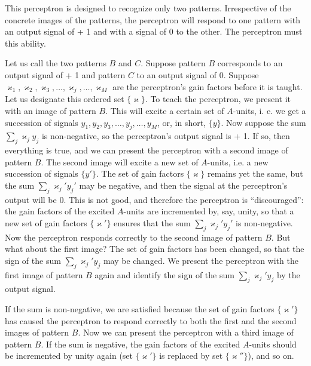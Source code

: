 This perceptron is designed to recognize only two patterns.
Irrespective of the concrete images of the patterns, the perceptron will
respond to one pattern with an output signal of + 1 and with a signal
of 0 to the other. The perceptron must  this ability.

 Let us call the two patterns $B$ and $C$. Suppose pattern $B$ corresponds to an output signal of + 1 and pattern $C$ to an output signal of 0. Suppose $\varkappa_{1}, \varkappa_{2}, \varkappa_{3},\ldots{} ,  \varkappa_{j},\ldots{}, \varkappa_{M}$ are the perceptron's gain factors before it is taught. Let us designate this ordered set $\{ \varkappa \}$. To teach the perceptron, we present it with an image of pattern $B$. This will excite a certain set of $A$-units, i. e. we get a succession of signals $y_{1}, y_{2}, y_{3},\ldots{} ,y_{j},\ldots{} , y_{M}$, or, in short, $\{ y \}$. Now suppose the sum $\sum_{j} \varkappa_{j} y_{j} $ is
non-negative, so the perceptron's output signal is + 1. If so, then
everything is true, and we can present the perceptron with a second
image of pattern $B$. The second image will excite a new set of $A$-units,
i.e. a new succession of signals $\{ y' \}$. The set of gain factors $\{ \varkappa \}$ remains yet the same, but the sum $\sum_{j} \varkappa_{j}' y_{j}' $ may be negative, and then the signal at the perceptron's output will be 0. This is not good, and therefore the perceptron is ``discouraged'': the gain factors of the excited $A$-units are incremented by, say, unity, so that a new set of gain factors $\{ \varkappa '\}$ ensures that the sum $\sum_{j} \varkappa_{j}' y_{j}' $ is non-negative. Now the perceptron responds correctly to the second image of pattern $B$. But what about the first image? The set of gain factors has been changed, so that the sign of the sum $\sum_{j} \varkappa_{j}' y_{j} $ may be changed. We present the perceptron with the first image of pattern $B$ again and identify the sign of the sum $\sum_{j} \varkappa_{j}' y_{j} $  by the output signal.

If the sum is non-negative, we are satisfied because the set of gain
factors $\{ \varkappa' \}$ has caused the perceptron to respond correctly to both the first and the second images of pattern $B$. Now we can present the
perceptron with a third image of pattern $B$. If the sum is negative, the
gain factors of the excited $A$-units should be incremented by unity again
(set $\{ \varkappa' \}$ is replaced by set $\{ \varkappa'' \}$), and so on.

